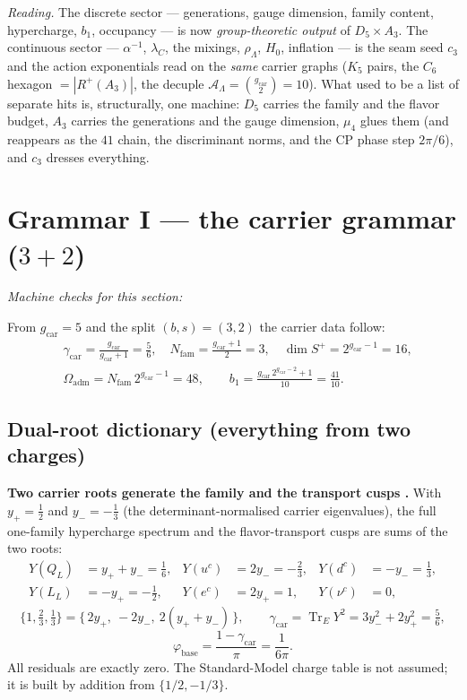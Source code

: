 \documentclass[11pt,a4paper]{article}
\newcommand{\gcar}{g_{\mathrm{car}}}
\newcommand{\Nfam}{N_{\mathrm{fam}}}
\newcommand{\Oadm}{\Omega_{\mathrm{adm}}}
\newcommand{\cthree}{c_3}
\newcommand{\phibase}{\varphi_{\mathrm{base}}}
\newcommand{\lC}{\lambda_C}
\newcommand{\AL}{\mathcal A_\Lambda}
\theoremstyle{definition}
\begin{document}
\markerkey

\noindent\emph{Reading.} The discrete sector --- generations, gauge dimension, family content,
hypercharge, $b_1$, occupancy --- is now \emph{group-theoretic output} of $D_5\times A_3$. The
continuous sector --- $\alpha^{-1}$, $\lC$, the mixings, $\rho_\Lambda$, $H_0$, inflation --- is the
seam seed $\cthree$ and the action exponentials read on the \emph{same} carrier graphs ($K_5$ pairs,
the $C_6$ hexagon $=|R^+(A_3)|$, the decuple $\AL=\binom{\gcar}{2}=10$). What used to be a list of
separate hits is, structurally, one machine: $D_5$ carries the family and the flavor budget, $A_3$
carries the generations and the gauge dimension, $\mu_4$ glues them (and reappears as the $41$ chain,
the discriminant norms, and the CP phase step $2\pi/6$), and $\cthree$ dresses everything.

\section{Grammar I --- the carrier grammar ($3+2$)}
\noindent\emph{Machine checks for this section:} 


From $\gcar=5$ and the split $(b,s)=(3,2)$ the carrier data follow:
\begin{equation}
\begin{aligned}
  &\gamma_{\mathrm{car}}=\frac{\gcar}{\gcar+1}=\frac56,\quad
  \Nfam=\frac{\gcar+1}{2}=3,\quad
  \dim S^+=2^{\gcar-1}=16,\\[2pt]
  &\Oadm=\Nfam\,2^{\gcar-1}=48,\qquad
  b_1=\frac{\gcar\,2^{\gcar-2}+1}{10}=\frac{41}{10}.
\end{aligned}
\end{equation}

\subsection{Dual-root dictionary (everything from two charges)}

\par\smallskip\noindent\textbf{Two carrier roots generate the family and the transport cusps \mE.}
With $y_+=\tfrac12$ and $y_-=-\tfrac13$ (the determinant-normalised carrier eigenvalues), the full
one-family hypercharge spectrum and the flavor-transport cusps are sums of the two roots:
\[
  \begin{aligned}
  Y(Q_L)&=y_++y_-=\tfrac16, & Y(u^c)&=2y_-=-\tfrac23, & Y(d^c)&=-y_-=\tfrac13,\\
  Y(L_L)&=-y_+=-\tfrac12, & Y(e^c)&=2y_+=1, & Y(\nu^c)&=0,
  \end{aligned}
\]
\[
  \{1,\tfrac23,\tfrac13\}=\{\,2y_+,\ -2y_-,\ 2(y_++y_-)\,\},\qquad
  \gamma_{\mathrm{car}}=\operatorname{Tr}_E Y^2=3y_-^2+2y_+^2=\tfrac56,
\]
\[
  \phibase=\frac{1-\gamma_{\mathrm{car}}}{\pi}=\frac{1}{6\pi}.
\]
All residuals are exactly zero. The Standard-Model charge table is not assumed; it is built by
addition from $\{1/2,-1/3\}$.
\par\smallskip
\end{document}
